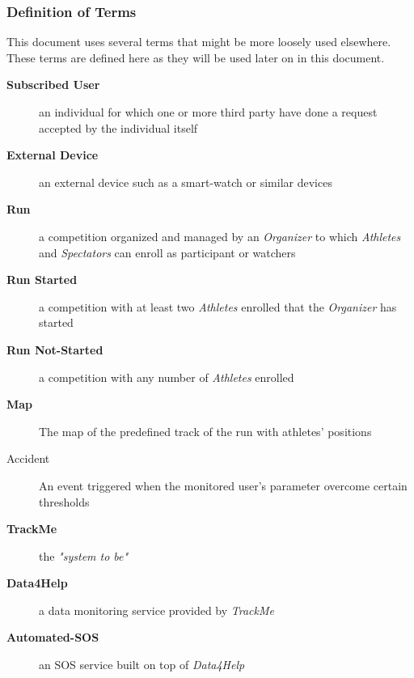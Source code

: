 \documentclass[a4paper]{article}
\begin{document}
            \subsubsection{Definition of Terms}
            This document uses several terms that might be more loosely used elsewhere. These terms are defined here as they will be used later on in this document.
                \begin{description}
                    \item[\textbf{Subscribed User}] an individual for which one or more third party have done a request accepted by the individual itself
                    
                    \item[\textbf{External Device}] an external device such as a smart-watch or similar devices
                    
                    \item[\textbf{Run}] a competition organized and managed by an \textit{Organizer} to which \textit{Athletes} and \textit{Spectators} can enroll as participant or watchers
                    
                    \item[\textbf{Run Started}] a competition with at least two \textit{Athletes} enrolled that the \textit{Organizer} has started
                    
                    \item[\textbf{Run Not-Started}] a competition with any number of \textit{Athletes} enrolled
                    
                    \item[\textbf{Map}] The map of the predefined track of the run with athletes' positions
                    
                    \item[Accident] An event triggered when the monitored user's parameter overcome certain thresholds
                    
                    \item[\textbf{TrackMe}] the \textit{"system to be"}
                    
                    \item[\textbf{Data4Help}] a data monitoring service provided by \textit{TrackMe}
                    
                    \item[\textbf{Automated-SOS}] an SOS service built on top of \textit{Data4Help}
                    

\end{description}
\end{document}

